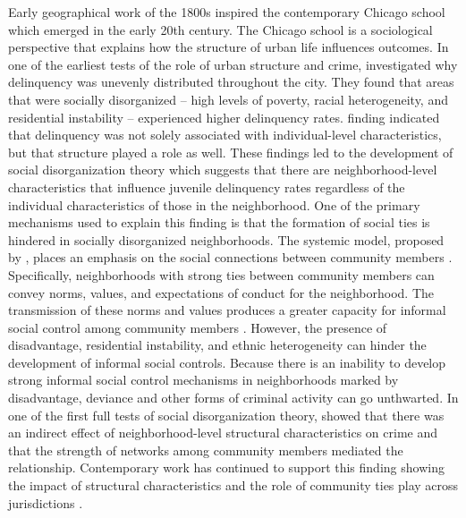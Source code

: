 Early geographical work of the 1800s inspired the contemporary Chicago school which emerged in the early 20th century. The Chicago school is a sociological perspective that explains how the structure of urban life influences outcomes. In one of the earliest tests of the role of urban structure and crime, \textcite{shaw_juvenile_1942} investigated why delinquency was unevenly distributed throughout the city. They found that areas that were socially disorganized – high levels of poverty, racial heterogeneity, and residential instability – experienced higher delinquency rates. \textcite{shaw_juvenile_1942} finding indicated that delinquency was not solely associated with individual-level characteristics, but that structure played a role as well. These findings led to the development of social disorganization theory which suggests that there are neighborhood-level characteristics that influence juvenile delinquency rates regardless of the individual characteristics of those in the neighborhood. One of the primary mechanisms used to explain this finding is that the formation of social ties is hindered in socially disorganized neighborhoods. The systemic model, proposed by \textcite{kasarda_community_1974}, places an emphasis on the social connections between community members \parencite{bursik_jr_economic_1993, bursik_systemic_2000}. Specifically, neighborhoods with strong ties between community members can convey norms, values, and expectations of conduct for the neighborhood. The transmission of these norms and values produces a greater capacity for informal social control among community members \parencite{kornhauser_social_1978}. However, the presence of disadvantage, residential instability, and ethnic heterogeneity can hinder the development of informal social controls. Because there is an inability to develop strong informal social control mechanisms in neighborhoods marked by disadvantage, deviance and other forms of criminal activity can go unthwarted. In one of the first full tests of social disorganization theory, \textcite{sampson_community_1989} showed that there was an indirect effect of neighborhood-level structural characteristics on crime and that the strength of networks among community members mediated the relationship. Contemporary work has continued to support this finding showing the impact of structural characteristics and the role of community ties play across jurisdictions \parencite{bursik_systemic_2000, levy_triple_2020, sampson_great_2012, sampson_neighborhoods_1997}.


